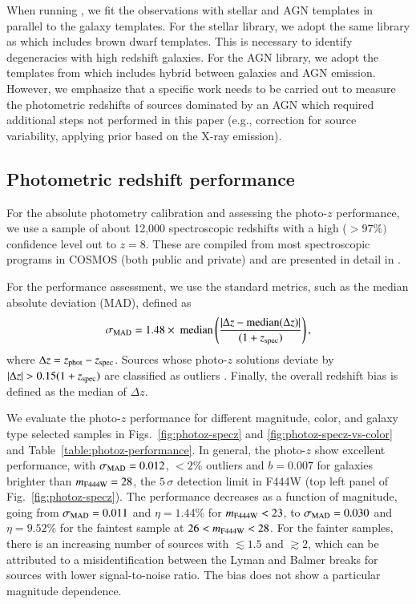 \documentclass[longauth]{aa}
\begin{document}
When running \lephare{}, we fit the observations with stellar and AGN templates in parallel to the galaxy templates. For the stellar library, we adopt the same library as \citet{Kauffmann2022} which includes brown dwarf templates. This is necessary to identify degeneracies with high redshift galaxies. For the AGN library, we adopt the templates from \citet{salvato_photoz_2011} which includes hybrid between galaxies and AGN emission. However, we emphasize that a specific work needs to be carried out to measure the photometric redshifts of sources dominated by an AGN which required additional steps not performed in this paper (e.g., correction for source variability, applying prior based on the X-ray emission).



\subsection{Photometric redshift performance} \label{sec:photoz-preformances}

For the absolute photometry calibration and assessing the photo-$z$ performance, we use a sample of about 12,000 spectroscopic redshifts with a high ($>97\%)$ confidence level out to $z=8$. These are compiled from most spectroscopic programs in COSMOS (both public and private) and are presented in detail in \cite{Khostovan2025}.

For the performance assessment, we use the standard metrics, such as the median absolute deviation (MAD), defined as
\begin{equation} \label{eq:sigma-mad}
\sigma_{\text{MAD}} = 1.48 \times \text{ median}\left(\dfrac{|\Delta z - \text{median}(\Delta z)|}{(1+z_{\rm spec})}\right),
\end{equation}
where $\Delta z = z_{\rm phot} - z_{\rm spec}$. Sources whose photo-$z$ solutions deviate by $|\Delta z| > 0.15 (1+z_{\rm spec})$ are classified as outliers \citep{Hildebrandt2012}. Finally, the overall redshift bias is defined as the median of $\Delta z$.


We evaluate the photo-$z$ performance for different magnitude, color, and galaxy type selected samples in Figs.~\ref{fig:photoz-specz} and \ref{fig:photoz-specz-vs-color} and Table~\ref{table:photoz-performance}. In general, the photo-$z$ show excellent performance, with $\sigma_{\rm MAD} = 0.012$, $<2 \%$ outliers and $b=0.007$ for galaxies brighter than $m_{\rm F444W} = 28$, the $5\,\sigma$ detection limit in F444W (top left panel of Fig.~\ref{fig:photoz-specz}). The performance decreases as a function of magnitude, going from $\sigma_{\rm MAD} = 0.011$ and $\eta=1.44\%$ for $m_{\rm F444W}<23$, to $\sigma_{\rm MAD} = 0.030$  and $\eta=9.52\%$ for the faintest sample at $26<m_{\rm F444W}<28$. For the fainter samples, there is an increasing number of sources with \zphot$\lesssim1.5$ and \zspec$\gtrsim2$, which can be attributed to a misidentification between the Lyman and Balmer breaks for sources with lower signal-to-noise ratio. The bias does not show a particular magnitude dependence.
\end{document}
